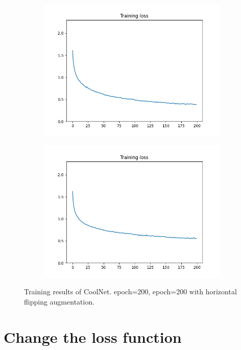 \documentclass[12pt]{article}
\begin{document}
\begin{figure}
  \begin{subfigure}{0.24\textwidth}
    \centering
    \includegraphics[width=\linewidth]{loss_4_noaug.png}
    \caption{}
    \label{fig:4_noaug}
  \end{subfigure}
  \begin{subfigure}{0.24\textwidth}
    \centering
    \includegraphics[width=\linewidth]{loss_4_aug.png}
    \caption{}
    \label{fig:4_aug}
  \end{subfigure}
  \caption{Training results of CoolNet.  epoch=200,  epoch=200 with horizontal flipping augmentation.}
  \label{fig:45}
\end{figure}

\section{Change the loss function}



\end{document}
